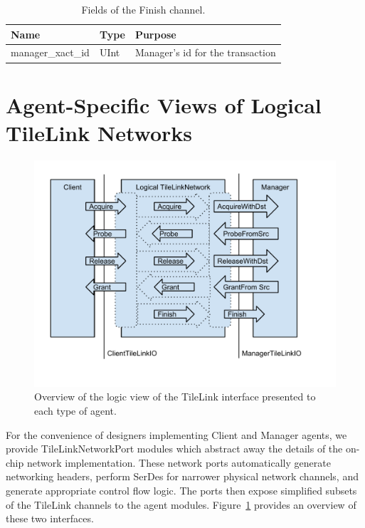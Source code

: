 \begin{table}[ht]
\begin{center}
\begin{tabular}{|l|l|l|}
    \hline
    Name & Type & Purpose \\ \hline \hline
manager\_xact\_id & UInt & Manager's id for the transaction \\ \hline
\end{tabular}
\end{center}
\caption{Fields of the Finish channel.}
\label{tab:finish}
\end{table}

\section{Agent-Specific Views of Logical TileLink Networks}

\begin{figure}[t!]
\centering
\includegraphics[width=1\columnwidth]{tilelink/figures/agent-specific.pdf}
\caption{Overview of the logic view of the TileLink interface presented to each type of agent.}
\label{fig:agent}
\end{figure}

For the convenience of designers implementing Client and Manager agents, we provide TileLinkNetworkPort modules which abstract away the details of the on-chip network implementation.
These network ports automatically generate networking headers, perform SerDes for narrower physical network channels, and generate appropriate control flow logic.
The ports then expose simplified subsets of the TileLink channels to the agent modules.
Figure~\ref{fig:agent} provides an overview of these two interfaces.

